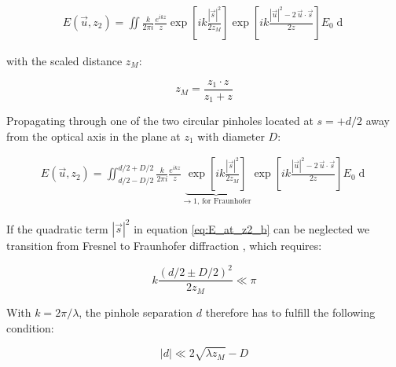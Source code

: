 \documentclass{osa-article}
\begin{document}
\begin{align}
    E(\vec{u},z_2) = \iint  \frac{k}{2 \pi i} \frac{e^{ikz}}{z} \exp{\left[ ik \frac{|\vec{s}|^2}{2z_{M}} \right]} \exp \left[ ik \frac{|\vec{u}|^2 - 2 \, \vec{u} \cdot \vec{s} }{2z} \right] E_0 \mathop{d\vec{s}} \label{eq:E_at_z2_b}
\end{align}

with the scaled distance $z_M$:

\begin{equation}
    z_M = \frac{z_1 \cdot z}{z_1 + z}
\end{equation}

Propagating through one of the two circular pinholes located at $s=+d/2$ away from the optical axis in the plane at $z_1$ with diameter $D$:

\begin{align}
    E(\vec{u},z_2) = \iint_{d/2-D/2}^{d/2+D/2}  \frac{k}{2 \pi i} \frac{e^{ikz}}{z} \underbrace{\exp{\left[ ik \frac{|\vec{s}|^2}{2z_{M}} \right]}}_{\longrightarrow 1 \text{, for Fraunhofer}} \exp \left[ ik \frac{|\vec{u}|^2 - 2 \, \vec{u} \cdot \vec{s} }{2z} \right] E_0 \mathop{d\vec{s}}
\end{align}

If the quadratic term $|\vec{s}|^2 $ in equation \ref{eq:E_at_z2_b} can be neglected we transition from Fresnel to Fraunhofer diffraction \cite[p.46]{BahaaE.A.Saleh2007-FundamentalsPhotonics}, which requires:

\begin{equation}\label{eq:classicaltransition}
	k \frac{\left( d/2 \pm D/2 \right)^2 }{2 z_M} \ll \pi
\end{equation}

With $k=2\pi/\lambda$, the pinhole separation $d$ therefore has to fulfill the following condition:


\begin{equation}\label{eq:cut-off}
	|d| \ll 2 \sqrt{\lambda z_M} - D
\end{equation}



\end{document}
